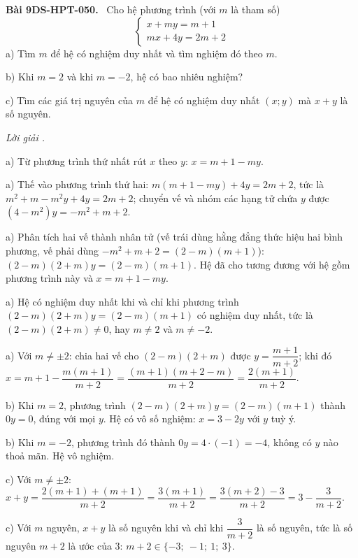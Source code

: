 \documentclass[12pt,a4paper]{article}
\newenvironment{problem}[1][]{\par\medskip\noindent\textbf{Bài #1.}\ }{\par}
\newenvironment{solution}[1][]{\par\noindent\textit{Lời giải #1.}\par}{\par}
\begin{document}
\begin{problem}[9DS-HPT-050]
Cho hệ phương trình (với $m$ là tham số)
\[ \begin{cases} x + my = m + 1 \\ mx + 4y = 2m + 2 \end{cases} \]
a) Tìm $m$ để hệ có nghiệm duy nhất và tìm nghiệm đó theo $m$.

b) Khi $m = 2$ và khi $m = -2$, hệ có bao nhiêu nghiệm?

c) Tìm các giá trị nguyên của $m$ để hệ có nghiệm duy nhất $(x; y)$ mà $x + y$ là số nguyên.

\begin{solution}
a) Từ phương trình thứ nhất rút $x$ theo $y$: $x = m + 1 - my$.

a) Thế vào phương trình thứ hai: $m(m + 1 - my) + 4y = 2m + 2$, tức là $m^2 + m - m^2y + 4y = 2m + 2$; chuyển vế và nhóm các hạng tử chứa $y$ được $(4 - m^2)y = -m^2 + m + 2$.

a) Phân tích hai vế thành nhân tử (vế trái dùng hằng đẳng thức hiệu hai bình phương, vế phải dùng $-m^2 + m + 2 = (2 - m)(m + 1)$): $(2 - m)(2 + m)y = (2 - m)(m + 1)$. Hệ đã cho tương đương với hệ gồm phương trình này và $x = m + 1 - my$.

a) Hệ có nghiệm duy nhất khi và chỉ khi phương trình $(2 - m)(2 + m)y = (2 - m)(m + 1)$ có nghiệm duy nhất, tức là $(2 - m)(2 + m) \neq 0$, hay $m \neq 2$ và $m \neq -2$.

a) Với $m \neq \pm 2$: chia hai vế cho $(2 - m)(2 + m)$ được $y = \dfrac{m + 1}{m + 2}$; khi đó $x = m + 1 - \dfrac{m(m + 1)}{m + 2} = \dfrac{(m + 1)(m + 2 - m)}{m + 2} = \dfrac{2(m + 1)}{m + 2}$.

b) Khi $m = 2$, phương trình $(2 - m)(2 + m)y = (2 - m)(m + 1)$ thành $0y = 0$, đúng với mọi $y$. Hệ có vô số nghiệm: $x = 3 - 2y$ với $y$ tuỳ ý.

b) Khi $m = -2$, phương trình đó thành $0y = 4 \cdot (-1) = -4$, không có $y$ nào thoả mãn. Hệ vô nghiệm.

c) Với $m \neq \pm 2$: $x + y = \dfrac{2(m + 1) + (m + 1)}{m + 2} = \dfrac{3(m + 1)}{m + 2} = \dfrac{3(m + 2) - 3}{m + 2} = 3 - \dfrac{3}{m + 2}$.

c) Với $m$ nguyên, $x + y$ là số nguyên khi và chỉ khi $\dfrac{3}{m + 2}$ là số nguyên, tức là số nguyên $m + 2$ là ước của $3$: $m + 2 \in \{-3;\ -1;\ 1;\ 3\}$.


\end{solution}
\end{problem}
\end{document}
